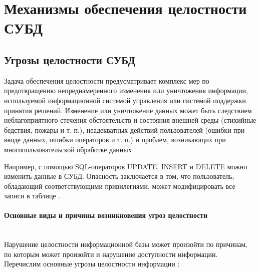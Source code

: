 \section{Механизмы обеспечения целостности СУБД}

\subsection{Угрозы целостности СУБД}
Задача обеспечения целостности предусматривает комплекс мер по предотвращению непреднамеренного изменения или уничтожения информации, используемой информационной системой управления или системой поддержки принятия решений. Изменение или уничтожение данных может быть следствием неблагоприятного стечения обстоятельств и состояния внешней среды (стихийные бедствия, пожары и т. п.), неадекватных действий пользователей (ошибки при вводе данных, ошибки операторов и т. п.) и проблем, возникающих при многопользовательской обработке данных \autocite{Lihonosov2011}.


Например, с помощью SQL-операторов UPDATE, INSERT и DELETE можно изменить данные в СУБД. Опасность заключается в том, что пользователь, обладающий соответствующими привилегиями, может модифицировать все записи в таблице \autocite{Utebov2008}.

\paragraph{Основные виды и причины возникновения угроз целостности} ~\\

Нарушение целостности информационной базы может произойти по причинам, по которым может произойти и нарушение доступности информации.
Перечислим основные угрозы целостности информации \autocite{Pirogov2009}:

